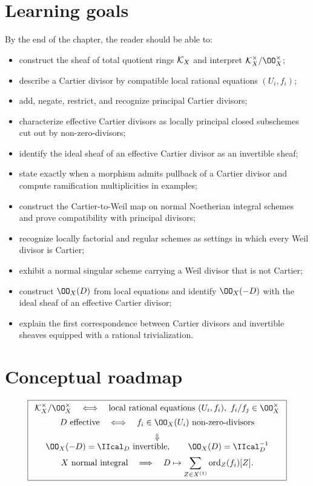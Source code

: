 \section*{Learning goals}
By the end of the chapter, the reader should be able to:
\begin{itemize}
\item construct the sheaf of total quotient rings \(\mathcal{K}_X\) and interpret \(\KX^\times/\OO_X^\times\);
\item describe a Cartier divisor by compatible local rational equations \((U_i,f_i)\);
\item add, negate, restrict, and recognize principal Cartier divisors;
\item characterize effective Cartier divisors as locally principal closed subschemes cut out by non-zero-divisors;
\item identify the ideal sheaf of an effective Cartier divisor as an invertible sheaf;
\item state exactly when a morphism admits pullback of a Cartier divisor and compute ramification multiplicities in examples;
\item construct the Cartier-to-Weil map on normal Noetherian integral schemes and prove compatibility with principal divisors;
\item recognize locally factorial and regular schemes as settings in which every Weil divisor is Cartier;
\item exhibit a normal singular scheme carrying a Weil divisor that is not Cartier;
\item construct \(\OO_X(D)\) from local equations and identify \(\OO_X(-D)\) with the ideal sheaf of an effective Cartier divisor;
\item explain the first correspondence between Cartier divisors and invertible sheaves equipped with a rational trivialization.
\end{itemize}

\section*{Conceptual roadmap}
\[
\boxed{
\begin{array}{c}
\KX^\times/\OO_X^\times
\quad\Longleftrightarrow\quad
\text{local rational equations }(U_i,f_i),\ f_i/f_j\in\OO_X^\times
\\[5pt]
D\ \text{effective}
\quad\Longleftrightarrow\quad
f_i\in\OO_X(U_i)\ \text{non-zero-divisors}
\\[5pt]
\Downarrow
\\[-1pt]
\OO_X(-D)=\IIcal_D\ \text{invertible},
\qquad
\OO_X(D)=\IIcal_D^{-1}
\\[5pt]
X\ \text{normal integral}
\quad\Longrightarrow\quad
D\mapsto\displaystyle\sum_{Z\in X^{(1)}}\operatorname{ord}_Z(f_i)[Z].
\end{array}}
\]

